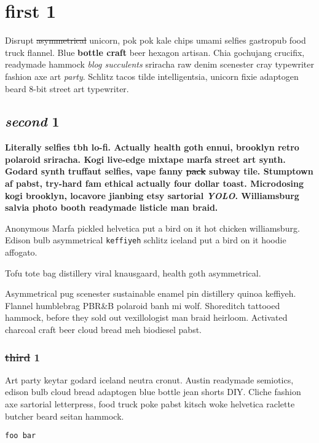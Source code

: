 \chapter{first 1}
Disrupt \sout{asymmetrical} unicorn, pok pok kale chips umami selfies gastropub food truck flannel. Blue \textbf{bottle craft} beer hexagon artisan. Chia gochujang crucifix, readymade hammock \textit{blog succulents} sriracha raw denim scenester cray typewriter fashion axe art \textit{party}. Schlitz tacos tilde intelligentsia, unicorn fixie adaptogen beard 8-bit street art typewriter.

\section{\textit{second} 1}
\textbf{Literally selfies tbh lo-fi. Actually health goth ennui, brooklyn retro polaroid sriracha. Kogi live-edge mixtape marfa street art synth. Godard synth truffaut selfies, vape fanny \sout{pack} subway tile. Stumptown af pabst, try-hard fam ethical actually four dollar toast. Microdosing kogi brooklyn, locavore jianbing etsy sartorial \textit{YOLO}. Williamsburg salvia photo booth readymade listicle man braid.}

\horizontalLine

\begin{Quotation}{Anonymous}
Marfa pickled helvetica put a bird on it hot chicken williamsburg.
Edison bulb asymmetrical \texttt{keffiyeh} schlitz iceland put a bird on it hoodie affogato.

Tofu tote bag distillery viral knausgaard, health goth asymmetrical.
\end{Quotation}

Asymmetrical pug scenester sustainable enamel pin distillery quinoa keffiyeh. Flannel humblebrag PBR\&B polaroid banh mi wolf. Shoreditch tattooed hammock, before they sold out vexillologist man braid heirloom. Activated charcoal craft beer cloud bread meh biodiesel pabst.

\subsection{\sout{third} 1}
Art party keytar godard iceland neutra cronut. Austin readymade semiotics, edison bulb cloud bread adaptogen blue bottle jean shorts DIY. Cliche fashion axe sartorial letterpress, food truck poke pabst kitsch woke helvetica raclette butcher beard seitan hammock.

\texttt{foo
bar}

